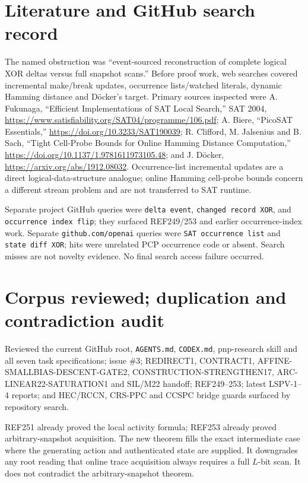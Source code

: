 \documentclass[11pt]{article}
\begin{document}
\section{Literature and GitHub search record}
The named obstruction was ``event-sourced reconstruction of complete logical XOR deltas versus full snapshot scans.''  Before proof work, web searches covered incremental make/break updates, occurrence lists/watched literals, dynamic Hamming distance and D\"ocker's target.  Primary sources inspected were A. Fukunaga, ``Efficient Implementations of SAT Local Search,'' SAT 2004, \url{https://www.satisfiability.org/SAT04/programme/106.pdf}; A. Biere, ``PicoSAT Essentials,'' \url{https://doi.org/10.3233/SAT190039}; R. Clifford, M. Jalsenius and B. Sach, ``Tight Cell-Probe Bounds for Online Hamming Distance Computation,'' \url{https://doi.org/10.1137/1.9781611973105.48}; and J. D\"ocker, \url{https://arxiv.org/abs/1912.08032}.  Occurrence-list incremental updates are a direct logical-data-structure analogue; online Hamming cell-probe bounds concern a different stream problem and are not transferred to SAT runtime.

Separate project GitHub queries were \texttt{delta event}, \texttt{changed record XOR}, and \texttt{occurrence index flip}; they surfaced REF249/253 and earlier occurrence-index work.  Separate \texttt{github.com/openai} queries were \texttt{SAT occurrence list} and \texttt{state diff XOR}; hits were unrelated PCP occurrence code or absent.  Search misses are not novelty evidence.  No final search access failure occurred.

\section{Corpus reviewed; duplication and contradiction audit}
Reviewed the current GitHub root, \texttt{AGENTS.md}, \texttt{CODEX.md}, pnp-research skill and all seven task specifications; issue \#3; REDIRECT1, CONTRACT1, AFFINE-SMALLBIAS-DESCENT-GATE2, CONSTRUCTION-STRENGTHEN17, ARC-LINEAR22-SATURATION1 and SIL/M22 handoff; REF249--253; latest LSPV-1--4 reports; and HEC/RCCN, CRS-PPC and CCSPC bridge guards surfaced by repository search.

REF251 already proved the local activity formula; REF253 already proved arbitrary-snapshot acquisition.  The new theorem fills the exact intermediate case where the generating action and authenticated state are supplied.  It downgrades any root reading that online trace acquisition always requires a full $L$-bit scan.  It does not contradict the arbitrary-snapshot theorem.
\end{document}
